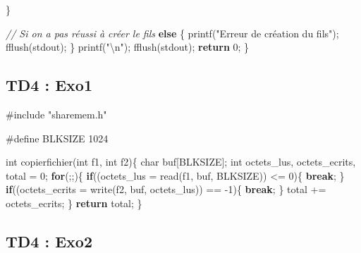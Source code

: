 \documentclass[
]{article}
\newenvironment{Shaded}{}{}
\newcommand{\CommentTok}[1]{\textcolor[rgb]{0.38,0.63,0.69}{\textit{#1}}}
\newcommand{\ControlFlowTok}[1]{\textcolor[rgb]{0.00,0.44,0.13}{\textbf{#1}}}
\newcommand{\DataTypeTok}[1]{\textcolor[rgb]{0.56,0.13,0.00}{#1}}
\newcommand{\DecValTok}[1]{\textcolor[rgb]{0.25,0.63,0.44}{#1}}
\newcommand{\ImportTok}[1]{#1}
\newcommand{\NormalTok}[1]{#1}
\newcommand{\PreprocessorTok}[1]{\textcolor[rgb]{0.74,0.48,0.00}{#1}}
\newcommand{\SpecialCharTok}[1]{\textcolor[rgb]{0.25,0.44,0.63}{#1}}
\newcommand{\StringTok}[1]{\textcolor[rgb]{0.25,0.44,0.63}{#1}}
\begin{document}
\begin{Shaded}
\begin{Highlighting}[]
\NormalTok{    \} }
    
    \CommentTok{// Si on a pas réussi à créer le fils}
    \ControlFlowTok{else}\NormalTok{ \{}
\NormalTok{        printf(}\StringTok{"Erreur de création du fils"}\NormalTok{);}
\NormalTok{        fflush(stdout);}
\NormalTok{    \}}
\NormalTok{    printf(}\StringTok{"}\SpecialCharTok{\textbackslash{}n}\StringTok{"}\NormalTok{);}
\NormalTok{    fflush(stdout);}
    \ControlFlowTok{return} \DecValTok{0}\NormalTok{;}
\NormalTok{\}}
\end{Highlighting}
\end{Shaded}

\hypertarget{td4-exo1}{%
\subsection{TD4 : Exo1}\label{td4-exo1}}

\begin{Shaded}
\begin{Highlighting}[]
\PreprocessorTok{\#include }\ImportTok{"sharemem.h"}

\PreprocessorTok{\#define BLKSIZE 1024}

\DataTypeTok{int}\NormalTok{ copierfichier(}\DataTypeTok{int}\NormalTok{ f1, }\DataTypeTok{int}\NormalTok{ f2)\{}
    \DataTypeTok{char}\NormalTok{ buf[BLKSIZE];}
    \DataTypeTok{int}\NormalTok{ octets\_lus, octets\_ecrits, total = }\DecValTok{0}\NormalTok{;}
    \ControlFlowTok{for}\NormalTok{(;;)\{}
        \ControlFlowTok{if}\NormalTok{((octets\_lus = read(f1, buf, BLKSIZE)) \textless{}= }\DecValTok{0}\NormalTok{)\{}
            \ControlFlowTok{break}\NormalTok{;}
\NormalTok{        \}}
        \ControlFlowTok{if}\NormalTok{((octets\_ecrits = write(f2, buf, octets\_lus)) == {-}}\DecValTok{1}\NormalTok{)\{}
            \ControlFlowTok{break}\NormalTok{;}
\NormalTok{        \}}
\NormalTok{        total += octets\_ecrits;}
\NormalTok{    \}}
    \ControlFlowTok{return}\NormalTok{ total;}
\NormalTok{\}}
\end{Highlighting}
\end{Shaded}

\hypertarget{td4-exo2}{%
\subsection{TD4 : Exo2}\label{td4-exo2}}
\end{document}
